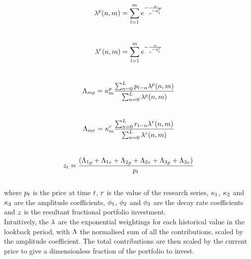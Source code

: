 \documentclass{article}
\begin{document}
\begin{equation}
\lambda^{p}(n,m) = \sum_{l = 1}^{m} e^{- \frac{ n}{e^{-\phi_l^p}}}
\end{equation}\\
\begin{equation}
\lambda^{r}(n,m) = \sum_{l = 1}^{m}  e^{- \frac{ n}{e^{-\phi_l^r}}}
\end{equation}\\
\begin{equation}
\Lambda_{m p} = \kappa_m^p \frac{\sum_{n=0}^{L} p_{t - n} \lambda^{p}(n, m)}{\sum_{n = 0}^{L} \lambda^{p}(n, m)}
\end{equation}\\
\begin{equation}
\Lambda_{m r} = \kappa_m^r \frac{\sum_{n=0}^{L} r_{t - n} \lambda^{r}(n, m)}{\sum_{n = 0}^{L} \lambda^{r}(n, m)} 
\end{equation}\\
\begin{equation}
z_{t} = \frac{({\Lambda_{1}}_{p} + {\Lambda_{1}}_{r} + {\Lambda_{2}}_{p} + {\Lambda_{2}}_{r} + {\Lambda_{3}}_{p} + {\Lambda_{3}}_{r})}{p_{t}}
\end{equation}
\\
where $p_t$ is the price at time $t$, $r$ is the value of the research series, $\kappa_{1}$, $\kappa_{2}$ and $\kappa_{3}$ are the amplitude coefficients, $\phi_{1}$, $\phi_{2}$ and $\phi_{3}$  are the decay rate coefficients and $z$ is the resultant fractional portfolio investment.\\
Intuitively, the $\lambda$ are the exponential weightings for each historical value in the lookback period, with $\Lambda$ the normalised sum of all the contributions, scaled by the amplitude coefficient. The total contributions are then scaled by the current price to give a dimensionless fraction of the portfolio to invest.
\hspace{200mm}
\hspace{200mm}
\keyterms
\furtherlinks
\end{document}
